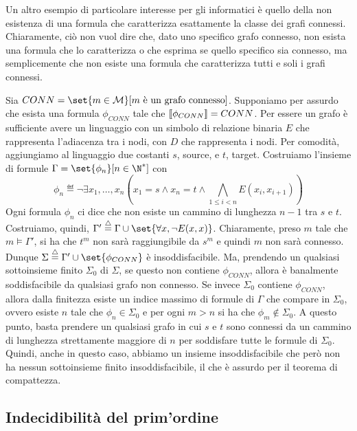 Un altro esempio di particolare interesse per gli informatici è quello della non esistenza di una formula che caratterizza esattamente la classe dei grafi connessi. Chiaramente, ciò non vuol dire che, dato uno specifico grafo connesso, non esista una formula che lo caratterizza o che esprima se quello specifico sia connesso, ma semplicemente che non esiste una formula che caratterizza tutti e soli i grafi connessi.

Sia \(CONN = \set{m\in\mathcal{M}}[ m \text{ è un grafo connesso}]\). Supponiamo per assurdo che esista una formula \(\phi_{CONN}\) tale che \(\den{\phi_{CONN}} = CONN\). Per essere un grafo è sufficiente avere un linguaggio con un simbolo di relazione binaria \(E\) che rappresenta l'adiacenza tra i nodi, con \(D\) che rappresenta i nodi. Per comodità, aggiungiamo al linguaggio due costanti \(s\), source, e \(t\), target. Costruiamo l'insieme di formule \(\Gamma = \set{\phi_n}[n\in\N^*]\) con
\[\phi_n \eqdef \neg\exists x_1, \ldots, x_n ( x_1 = s \land x_n = t \land \bigwedge_{1 \leq i < n} E(x_i, x_{i+1}))\]
Ogni formula \(\phi_n\) ci dice che non esiste un cammino di lunghezza \(n-1\) tra \(s\) e \(t\). Costruiamo, quindi, \(\Gamma' \eqdef \Gamma \cup \set{\forall x, \neg E(x,x)}\). Chiaramente, preso \(m\) tale che \(m\models\Gamma'\), si ha che \(t^m\) non sarà raggiungibile da \(s^m\) e quindi \(m\) non sarà connesso. Dunque \(\Sigma \eqdef \Gamma' \cup \set{\phi_{CONN}}\) è insoddisfacibile. Ma, prendendo un qualsiasi sottoinsieme finito \(\Sigma_0\) di \(\Sigma\), se questo non contiene \(\phi_{CONN}\), allora è banalmente soddisfacibile da qualsiasi grafo non connesso. Se invece \(\Sigma_0\) contiene \(\phi_{CONN}\), allora dalla finitezza esiste un indice massimo di formule di \(\Gamma\) che compare in \(\Sigma_0\), ovvero esiste \(n\) tale che \(\phi_n \in \Sigma_0\) e per ogni \(m > n\) si ha che \(\phi_m \not\in \Sigma_0\). A questo punto, basta prendere un qualsiasi grafo in cui \(s\) e \(t\) sono connessi da un cammino di lunghezza strettamente maggiore di \(n\) per soddisfare tutte le formule di \(\Sigma_0\). Quindi, anche in questo caso, abbiamo un insieme insoddisfacibile che però non ha nessun sottoinsieme finito insoddisfacibile, il che è assurdo per il teorema di compattezza.

\subsection{Indecidibilità del prim'ordine}

